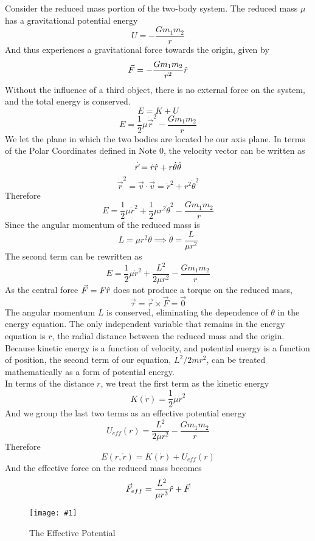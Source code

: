 \documentclass[11pt]{article}
\newcommand{\fig}[4]{
    \begin{figure}[H]
        \centering
        \texttt{[image: \#1]}
        \caption{#2}
        \label{exp4fit}
    \end{figure}
}
\theoremstyle{gangnamstyle}{\newtheorem{definition}{Definition}[]}
\theoremstyle{gangnamstyle}{\newtheorem{example}{Example}[]}
\theoremstyle{gangnamstyle}{\newtheorem{problem}{Problem}[]}
\theoremstyle{gangnamstyle}{\newtheorem{warning}{Warning}[]}
\begin{document}
Consider the reduced mass portion of the two-body system. The reduced mass $\mu$ has a gravitational potential energy
\[ U = -\frac{Gm_1m_2}{r} \]
And thus experiences a gravitational force towards the origin, given by
\[ \Vec{F} = -\frac{Gm_1m_2}{r^2}\Hat{r} \]
Without the influence of a third object, there is no external force on the system, and the total energy is conserved. 
\[ E = K + U \]
\[ E = \frac{1}{2}\mu\Dot{\Vec{r}}^2 -\frac{Gm_1m_2}{r} \]
We let the plane in which the two bodies are located be our axis plane. In terms of the Polar Coordinates defined in Note 0, the velocity vector can be written as
\[ \Dot{\Vec{r}} = \Dot{r}\Hat{r} + r\Dot{\theta}\Hat{\theta} \]
\[ \Dot{\Vec{r}}^2 = \Vec{v} \cdot \Vec{v} = \Dot{r}^2 + r^2\Dot{\theta}^2 \]
Therefore
\[ E = \frac{1}{2}\mu\Dot{r}^2 + \frac{1}{2}\mu r^2\Dot{\theta}^2 -\frac{Gm_1m_2}{r} \]
Since the angular momentum of the reduced mass is
\[ L = \mu r^2\Dot{\theta} \implies \Dot{\theta} = \frac{L}{\mu r^2} \]
The second term can be rewritten as
\[ E = \frac{1}{2}\mu\Dot{r}^2 + \frac{L^2}{2\mu r^2} - \frac{Gm_1m_2}{r} \]
As the central force $\Vec{F} = F \Hat{r}$ does not produce a torque on the reduced mass, 
\[ \Vec{\tau} = \Vec{r} \times \Vec{F} = \Vec{0} \]
The angular momentum $L$ is conserved, eliminating the dependence of $\theta$ in the energy equation. The only independent variable that remains in the energy equation is $r$, the radial distance between the reduced mass and the origin. \\
Because kinetic energy is a function of velocity, and potential energy is a function of position, the second term of our equation, $L^2/2mr^2$, can be treated mathematically as a form of potential energy. \\

In terms of the distance $r$, we treat the first term as the kinetic energy 
\[ K(\Dot{r}) = \frac{1}{2}\mu\Dot{r}^2 \]
And we group the last two terms as an effective potential energy
\[ U_{eff}(r) = \frac{L^2}{2\mu r^2} - \frac{Gm_1m_2}{r} \]
Therefore
\[ E(r, \Dot{r}) = K(\Dot{r}) + U_{eff}(r) \]
And the effective force on the reduced mass becomes
\[ \Vec{F}_{eff} = \frac{L^2}{\mu r^3}\Hat{r} + \Vec{F} \]

\fig{figs/n5/ueff.jpg}{The Effective Potential}{0.5}{0}
\end{document}
